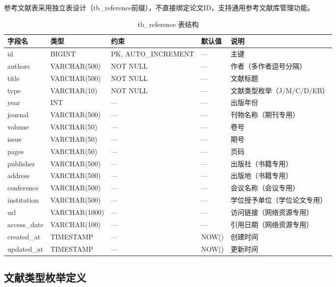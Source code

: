\documentclass{../../softeng}
\begin{document}
参考文献表采用独立表设计（tb\_reference前缀），不直接绑定论文ID，支持通用参考文献库管理功能。

\begin{table}[htbp]
\centering
\caption{tb\_reference 表结构}
\label{tab:tb_reference}
\begin{tabular}{lllll}
\toprule
\textbf{字段名} & \textbf{类型} & \textbf{约束} & \textbf{默认值} & \textbf{说明} \\
\midrule
id          & BIGINT    & PK, AUTO\_INCREMENT & —      & 主键 \\
authors     & VARCHAR(500) & NOT NULL        & —      & 作者（多作者逗号分隔）\\
title       & VARCHAR(500) & NOT NULL        & —      & 文献标题 \\
type        & VARCHAR(10)  & NOT NULL        & —      & 文献类型枚举（J/M/C/D/EB）\\
year        & INT       & —                & —      & 出版年份 \\
journal     & VARCHAR(500) & —                & —      & 刊物名称（期刊专用）\\
volume      & VARCHAR(50)  & —                & —      & 卷号 \\
issue       & VARCHAR(50)  & —                & —      & 期号 \\
pages       & VARCHAR(50)  & —                & —      & 页码 \\
publisher   & VARCHAR(500) & —                & —      & 出版社（书籍专用）\\
address     & VARCHAR(500) & —                & —      & 出版地（书籍专用）\\
conference  & VARCHAR(500) & —                & —      & 会议名称（会议专用）\\
institution & VARCHAR(500) & —                & —      & 学位授予单位（学位论文专用）\\
url         & VARCHAR(1000)& —                & —      & 访问链接（网络资源专用）\\
access\_date & VARCHAR(100) & —                & —      & 引用日期（网络资源专用）\\
created\_at  & TIMESTAMP  & —                & NOW()  & 创建时间 \\
updated\_at  & TIMESTAMP  & —                & NOW()  & 更新时间 \\
\bottomrule
\end{tabular}
\end{table}

\subsection{文献类型枚举定义}
\end{document}
